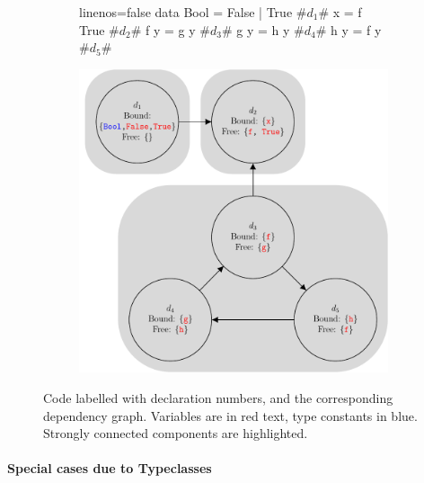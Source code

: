 \documentclass[dissertation.tex]{subfiles}
\begin{document}
{{        \begin{figure}[h]
        \centering
        \begin{subfigure}[t]{0.4\textwidth}
            \begin{haskellfigure*}{linenos=false}
            data Bool = False | True      #\(d_1\)#
            x = f True                    #\(d_2\)#
            f y = g y                     #\(d_3\)#
            g y = h y                     #\(d_4\)#
            h y = f y                     #\(d_5\)#
            \end{haskellfigure*}
        \end{subfigure}
        \begin{subfigure}[t]{0.5\textwidth}
            \includegraphics[width=\textwidth, valign=t]{figures/dependency_graph.pdf}
        \end{subfigure}
        \caption
        {
            Code labelled with declaration numbers, and the corresponding dependency graph. Variables are in red text, type constants in blue. Strongly connected components are highlighted.
        }
        \label{fig:dependency-graph}
        \end{figure}

        \paragraph*{Special cases due to Typeclasses}

}}
\end{document}
